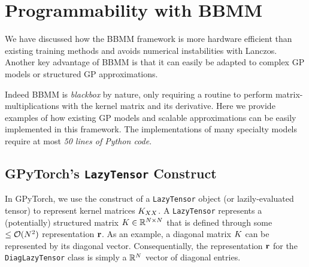 \section{Programmability with BBMM}
\label{sec:programmability}
We have discussed how the BBMM framework is more hardware efficient than existing training methods and avoids numerical instabilities with Lanczos.
Another key advantage of BBMM is that it can easily be adapted to complex GP models or structured GP approximations.

Indeed BBMM is \emph{blackbox} by nature, only requiring a routine to perform matrix-multiplications with the kernel matrix and its derivative.
Here we provide examples of how existing GP models and scalable approximations can be easily implemented in this framework.
The implementations of many specialty models require at most \emph{50 lines of Python code}.

\subsection{GPyTorch's {\tt LazyTensor} Construct}
In GPyTorch, we use the construct of a {\tt LazyTensor} object (or lazily-evaluated tensor) to represent kernel matrices $K_{XX}$.
A {\tt LazyTensor} represents a (potentially) structured matrix $K \in \mathbb{R}^{N \times N}$ that is defined through some $\leq \bigo{N^2}$ representation $\mathbf{r}$.
As an example, a diagonal matrix $K$ can be represented by its diagonal vector.
Consequentially, the representation $\mathbf{r}$ for the {\tt DiagLazyTensor} class is simply a $\mathbb{R}^N$ vector of diagonal entries.

